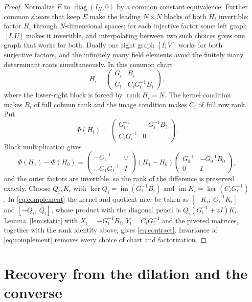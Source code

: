\documentclass[11pt]{article}
\newcommand{\rk}{\operatorname{rank}}
\newcommand{\im}{\operatorname{im}}
\begin{document}
\begin{proof}
Normalize $E$ to $\operatorname{diag}(I_N,0)$ by a common constant equivalence. Further common shears that keep $E$ make the leading $N\times N$ blocks of both $H_i$ invertible: factor $H_i$ through $N$-dimensional spaces; for each injective factor some left graph $[I,U]$ makes it invertible, and interpolating between two such choices gives one graph that works for both. Dually one right graph $[I;V]$ works for both surjective factors, and the infinitely many field elements avoid the finitely many determinant roots simultaneously. In this common chart
\[
H_i=\begin{pmatrix}G_i&B_i\\ C_i&C_iG_i^{-1}B_i\end{pmatrix},
\]
where the lower-right block is forced by $\rk H_i=N$. The kernel condition makes $B_i$ of full column rank and the image condition makes $C_i$ of full row rank. Put
\[
\Phi(H_i)=\begin{pmatrix}G_i^{-1}&-G_i^{-1}B_i\\ C_iG_i^{-1}&0\end{pmatrix}.
\]
Block multiplication gives
\[
\Phi(H_1)-\Phi(H_0)=
\begin{pmatrix}-G_1^{-1}&0\\ -C_1G_1^{-1}&I\end{pmatrix}(H_1-H_0)
\begin{pmatrix}G_0^{-1}&-G_0^{-1}B_0\\ 0&I\end{pmatrix},
\]
and the outer factors are invertible, so the rank of the difference is preserved exactly. Choose $Q_i,K_i$ with $\ker Q_i=\im(G_i^{-1}B_i)$ and $\im K_i=\ker(C_iG_i^{-1})$. In \eqref{eq:complement} the kernel and quotient may be taken as $[-K_i;\ G_i^{-1}K_i]$ and $[-Q_i,\ Q_i]$, whose product with the diagonal pencil is $Q_i(G_i^{-1}+zI)K_i$. Lemma~\ref{lem:static} with $X_i=-G_i^{-1}B_i$, $Y_i=C_iG_i^{-1}$ and the pivoted matrices, together with the rank identity above, gives \eqref{eq:contract}. Invariance of \eqref{eq:complement} removes every choice of chart and factorization.
\end{proof}

\section{Recovery from the dilation and the converse}\label{sec:converse}
\end{document}
